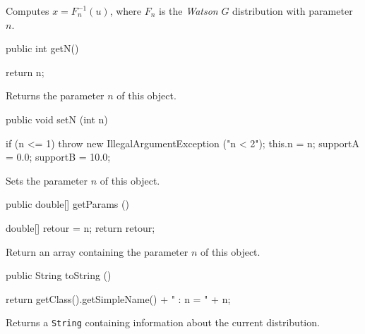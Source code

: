 \begin{tabb}
  Computes $x = F_n^{-1}(u)$, where $F_n$ is the 
  {\em Watson\/} $G$ distribution with parameter $n$.
\end{tabb}
\begin{code}

   public int getN()\begin{hide} {
      return n;
   }\end{hide}
\end{code}
 \begin{tabb} Returns the parameter $n$ of this object.
 \end{tabb}
\begin{code}

   public void setN (int n)\begin{hide} {
      if (n <= 1)
         throw new IllegalArgumentException ("n < 2");
      this.n = n;
      supportA = 0.0;
      supportB = 10.0;
   }\end{hide}
\end{code}
 \begin{tabb} Sets the parameter $n$ of this object.
 \end{tabb}
 \begin{code}

   public double[] getParams ()\begin{hide} {
      double[] retour = {n};
      return retour;
   }\end{hide}
\end{code}
\begin{tabb}
   Return an array containing the parameter $n$ of this object.
\end{tabb}
\begin{hide}\begin{code}

   public String toString ()\begin{hide} {
      return getClass().getSimpleName() + " : n = " + n;
   }\end{hide}
\end{code}
\begin{tabb}
   Returns a \texttt{String} containing information about the current distribution.
\end{tabb}\end{hide}
\begin{code}\begin{hide}
}\end{hide}
\end{code}
